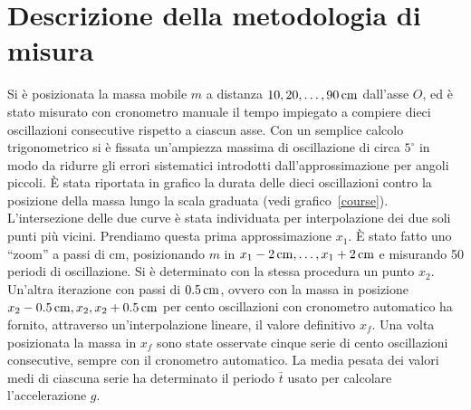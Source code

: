 \documentclass[italian,a4paper]{article}
\begin{document}
\section{Descrizione della metodologia di misura}
Si è posizionata la massa mobile $m$ a distanza $10, 20, \dots, \unit[90]{cm}$ dall'asse $O$, ed è stato misurato con cronometro manuale il tempo impiegato a compiere dieci oscillazioni consecutive rispetto a ciascun asse. Con un semplice calcolo trigonometrico si è fissata un'ampiezza massima di oscillazione di circa $5^\circ$ in modo da ridurre gli errori sistematici introdotti dall'approssimazione per angoli piccoli. \`E stata riportata in grafico la durata delle dieci oscillazioni contro la posizione della massa lungo la scala graduata (vedi grafico~\ref{course}). L'intersezione delle due curve è stata individuata per interpolazione dei due soli punti più vicini. Prendiamo questa prima approssimazione $x_1$. \`E stato fatto uno ``zoom'' a passi di \unit[1]{cm}, posizionando $m$ in $x_1 - \unit[2]{cm},\dots,x_1 + \unit[2]{cm}$ e misurando 50 periodi di oscillazione. Si è determinato con la stessa procedura un punto $x_2$. Un'altra iterazione con passi di $\unit[0.5]{cm}$, ovvero con la massa in posizione $x_2 - \unit[0.5]{cm},x_2,x_2 + \unit[0.5]{cm}$ per cento oscillazioni con cronometro automatico ha fornito, attraverso un'interpolazione lineare, il valore definitivo $x_f$. Una volta posizionata la massa in $x_f$ sono state osservate cinque serie di cento oscillazioni consecutive, sempre con il cronometro automatico. La media pesata dei valori medi di ciascuna serie ha determinato il periodo $\bar{t}$ usato per calcolare l'accelerazione $g$.
\end{document}
